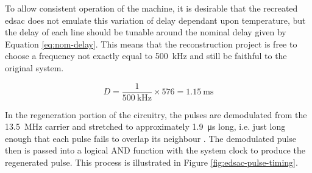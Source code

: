 To allow consistent operation of the machine, it is desirable that the recreated \gls{edsac} does not emulate this variation of delay dependant upon temperature, but the delay of each line should be tunable around the nominal delay given by Equation \ref{eq:nom-delay}. This means that the reconstruction project is free to choose a frequency not exactly equal to \SI{500}{\kilo\hertz} and still be faithful to the original system.

\newcommand{\nominalLongTubeDelayMs}{1.15}

\begin{equation}
	D = \frac{1}{\SI{500}{\kilo\hertz}} \times 576 = \SI{\nominalLongTubeDelayMs}{\milli\second}  \label{eq:nom-delay}
\end{equation}


In the regeneration portion of the circuitry, the pulses are demodulated from the \SI{13.5}{\mega\hertz} carrier and stretched to approximately \SI{1.9}{\micro\second} long, i.e. just long enough that each pulse fails to overlap its neighbour \cite[p.212]{wilkes1948}. The demodulated pulse then is passed into a logical AND function with the system clock to produce the regenerated pulse. This process is illustrated in Figure \ref{fig:edsac-pulse-timing}.

